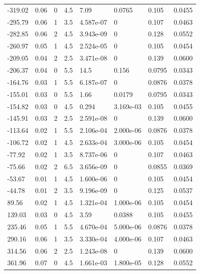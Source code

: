 \documentclass[preview]{standalone}
\begin{document}
{{\begin{tabular}{L{1.2cm}C{1.2cm} C{0.3cm}C{0.5cm} C{1.4cm}C{1.4cm} C{1.4cm}C{1.4cm}}
  -319.02  &  0.06  & 0     & 4.5 &  7.09  & 0.0765  & 0.105 &  0.0455   \\ 
  -295.79  &  0.06  & 1     & 3.5 &  4.587e-07  & 0  & 0.107 &  0.0463   \\ 
  -282.85  &  0.06  & 2     & 4.5 &  3.943e-09  & 0  & 0.128 &  0.0552   \\ 
  -260.97  &  0.05  & 1     & 4.5 &  2.524e-05  & 0  & 0.105 &  0.0454   \\ 
  -209.05  &  0.04  & 2     & 2.5 &  3.471e-08  & 0  & 0.139 &  0.0600   \\ 
  -206.37  &  0.04  & 0     & 5.5 &  14.5  & 0.156  & 0.0795 &  0.0343   \\ 
  -164.76  &  0.03  & 1     & 5.5 &  6.187e-07  & 0  & 0.0876 &  0.0378   \\ 
  -155.01  &  0.03  & 0     & 5.5 &  1.66  & 0.0179  & 0.0795 &  0.0343   \\ 
  -154.82  &  0.03  & 0     & 4.5 &  0.294  & 3.169e-03  & 0.105 &  0.0455   \\ 
  -145.91  &  0.03  & 2     & 2.5 &  2.591e-08  & 0  & 0.139 &  0.0600   \\ 
  -113.64  &  0.02  & 1     & 5.5 &  2.106e-04  & 2.000e-06  & 0.0876 &  0.0378   \\ 
  -106.72  &  0.02  & 1     & 4.5 &  2.633e-04  & 3.000e-06  & 0.105 &  0.0454   \\ 
  -77.92  &  0.02  & 1     & 3.5 &  8.737e-06  & 0  & 0.107 &  0.0463   \\ 
  -75.66  &  0.02  & 2     & 6.5 &  3.656e-09  & 0  & 0.0855 &  0.0369   \\ 
  -53.67  &  0.01  & 1     & 4.5 &  1.600e-06  & 0  & 0.105 &  0.0454   \\ 
  -44.78  &  0.01  & 2     & 3.5 &  9.196e-09  & 0  & 0.125 &  0.0537   \\ 
  89.56  &  0.02  & 1     & 4.5 &  1.321e-04  & 1.000e-06  & 0.105 &  0.0454   \\ 
  139.03  &  0.03  & 0     & 4.5 &  3.59  & 0.0388  & 0.105 &  0.0455   \\ 
  235.46  &  0.05  & 1     & 5.5 &  4.670e-04  & 5.000e-06  & 0.0876 &  0.0378   \\ 
  290.16  &  0.06  & 1     & 3.5 &  3.330e-04  & 4.000e-06  & 0.107 &  0.0463   \\ 
  314.56  &  0.06  & 2     & 2.5 &  1.243e-08  & 0  & 0.139 &  0.0600   \\ 
  361.96  &  0.07  & 0     & 4.5 &  1.661e-03  & 1.800e-05  & 0.128 &  0.0552   \\ 

\end{tabular}}}
\end{document}
